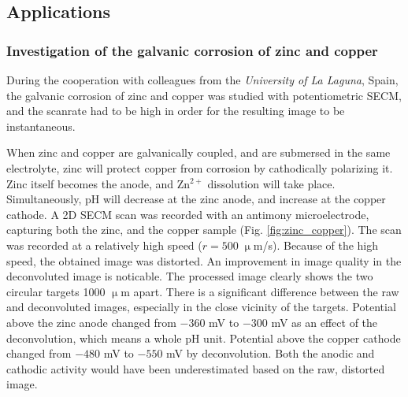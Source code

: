 		\subsection{Applications}
			\subsubsection{Investigation of the galvanic corrosion of zinc and copper}
During the cooperation with colleagues from the \emph{University of La Laguna}, Spain, the galvanic corrosion of zinc and copper was studied with potentiometric SECM, and the scanrate had to be high in order for the resulting image to be instantaneous. 

When zinc and copper are galvanically coupled, and are submersed in the same electrolyte, zinc will protect copper from corrosion by cathodically polarizing it.
Zinc itself becomes the anode, and Zn$^{2+}$ dissolution will take place.
Simultaneously, pH will decrease at the zinc anode, and increase at the copper cathode.
A 2D SECM scan was recorded with an antimony microelectrode, capturing both the zinc, and the copper sample (Fig. \ref{fig:zinc_copper}).
The scan was recorded at a relatively high speed ($r = 500\;\upmu$m/s).
Because of the high speed, the obtained image was distorted.
An improvement in image quality in the deconvoluted image is noticable.
The processed image clearly shows the two circular targets 1000 $\upmu$m apart.
There is a significant difference between the raw and deconvoluted images, especially in the close vicinity of the targets.
Potential above the zinc anode changed from $-360$ mV to $-300$ mV as an effect of the deconvolution, which means a whole pH unit.
Potential above the copper cathode changed from $-480$ mV to $-550$ mV by deconvolution.
Both the anodic and cathodic activity would have been underestimated based on the raw, distorted image.

